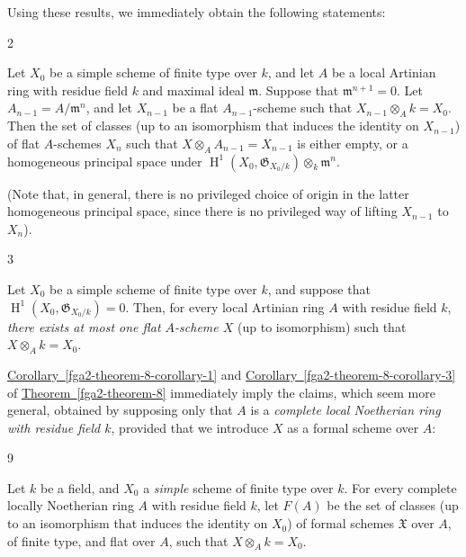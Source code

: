   Using these results, we immediately obtain the following statements:\begin{corollary}{2}\label{fga2-theorem-8-corollary-2}\skipsinglepar\par{}Let \(X_0\) be a simple scheme of finite type over \(k\), and let \(A\) be a local Artinian ring with residue field \(k\) and maximal ideal \(\mathfrak {m}\).
    Suppose that \(\mathfrak {m}^{n+1}=0\).
    Let \(A_{n-1}=A/\mathfrak {m}^n\), and let \(X_{n-1}\) be a flat \(A_{n-1}\)-scheme such that \(X_{n-1}\otimes _Ak=X_0\).
    Then the set of classes (up to an isomorphism that induces the identity on \(X_{n-1}\)) of flat \(A\)-schemes \(X_n\) such that \(X\otimes _AA_{n-1}=X_{n-1}\) is either empty, or a homogeneous principal space under \(\operatorname {H}^1(X_0,\mathfrak {G}_{X_0/k})\otimes _k\mathfrak {m}^n\).\end{corollary}\par{}(Note that, in general, there is no privileged choice of origin in the latter homogeneous principal space, since there is no privileged way of lifting \(X_{n-1}\) to \(X_n\)).\begin{corollary}{3}\label{fga2-theorem-8-corollary-3}\skipsinglepar\par{}Let \(X_0\) be a simple scheme of finite type over \(k\), and suppose that \(\operatorname {H}^1(X_0,\mathfrak {G}_{X_0/k})=0\).
    Then, for every local Artinian ring \(A\) with residue field \(k\), \emph{there exists at most one flat \(A\)-scheme \(X\)} (up to isomorphism) such that \(X\otimes _Ak=X_0\).\end{corollary}\par{}\hyperref[fga2-theorem-8-corollary-1]{Corollary~\ref*{fga2-theorem-8-corollary-1}} and \hyperref[fga2-theorem-8-corollary-3]{Corollary~\ref*{fga2-theorem-8-corollary-3}} of \hyperref[fga2-theorem-8]{Theorem~\ref*{fga2-theorem-8}} immediately imply the claims, which seem more general, obtained by supposing only that \(A\) is a \emph{complete local Noetherian ring with residue field \(k\)}, provided that we introduce \(X\) as a formal scheme over \(A\):\begin{theorem}{9}\label{fga2-theorem-9}\skipsinglepar\par{}Let \(k\) be a field, and \(X_0\) a \emph{simple} scheme of finite type over \(k\).
    For every complete locally Noetherian ring \(A\) with residue field \(k\), let \(F(A)\) be the set of classes (up to an isomorphism that induces the identity on \(X_0\)) of formal schemes \(\mathfrak {X}\) over \(A\), of finite type, and flat over \(A\), such that \(X\otimes _Ak=X_0\).
    

\end{theorem}
